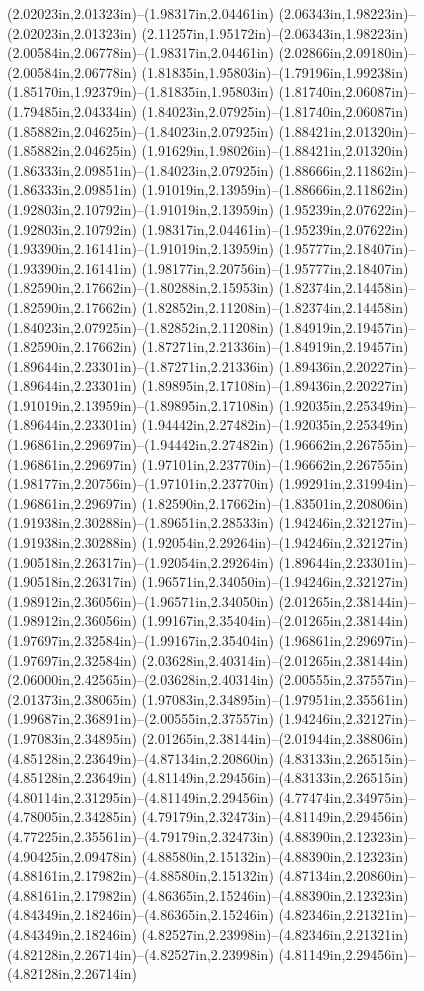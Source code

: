 (2.02023in,2.01323in)--(1.98317in,2.04461in) (2.06343in,1.98223in)--(2.02023in,2.01323in) (2.11257in,1.95172in)--(2.06343in,1.98223in) (2.00584in,2.06778in)--(1.98317in,2.04461in) (2.02866in,2.09180in)--(2.00584in,2.06778in) (1.81835in,1.95803in)--(1.79196in,1.99238in) (1.85170in,1.92379in)--(1.81835in,1.95803in) (1.81740in,2.06087in)--(1.79485in,2.04334in) (1.84023in,2.07925in)--(1.81740in,2.06087in) (1.85882in,2.04625in)--(1.84023in,2.07925in) (1.88421in,2.01320in)--(1.85882in,2.04625in) (1.91629in,1.98026in)--(1.88421in,2.01320in) (1.86333in,2.09851in)--(1.84023in,2.07925in) (1.88666in,2.11862in)--(1.86333in,2.09851in) (1.91019in,2.13959in)--(1.88666in,2.11862in) (1.92803in,2.10792in)--(1.91019in,2.13959in) (1.95239in,2.07622in)--(1.92803in,2.10792in) (1.98317in,2.04461in)--(1.95239in,2.07622in) (1.93390in,2.16141in)--(1.91019in,2.13959in) (1.95777in,2.18407in)--(1.93390in,2.16141in) (1.98177in,2.20756in)--(1.95777in,2.18407in) (1.82590in,2.17662in)--(1.80288in,2.15953in) (1.82374in,2.14458in)--(1.82590in,2.17662in) (1.82852in,2.11208in)--(1.82374in,2.14458in) (1.84023in,2.07925in)--(1.82852in,2.11208in) (1.84919in,2.19457in)--(1.82590in,2.17662in) (1.87271in,2.21336in)--(1.84919in,2.19457in) (1.89644in,2.23301in)--(1.87271in,2.21336in) (1.89436in,2.20227in)--(1.89644in,2.23301in) (1.89895in,2.17108in)--(1.89436in,2.20227in) (1.91019in,2.13959in)--(1.89895in,2.17108in) (1.92035in,2.25349in)--(1.89644in,2.23301in) (1.94442in,2.27482in)--(1.92035in,2.25349in) (1.96861in,2.29697in)--(1.94442in,2.27482in) (1.96662in,2.26755in)--(1.96861in,2.29697in) (1.97101in,2.23770in)--(1.96662in,2.26755in) (1.98177in,2.20756in)--(1.97101in,2.23770in) (1.99291in,2.31994in)--(1.96861in,2.29697in) (1.82590in,2.17662in)--(1.83501in,2.20806in) (1.91938in,2.30288in)--(1.89651in,2.28533in) (1.94246in,2.32127in)--(1.91938in,2.30288in) (1.92054in,2.29264in)--(1.94246in,2.32127in) (1.90518in,2.26317in)--(1.92054in,2.29264in) (1.89644in,2.23301in)--(1.90518in,2.26317in) (1.96571in,2.34050in)--(1.94246in,2.32127in) (1.98912in,2.36056in)--(1.96571in,2.34050in) (2.01265in,2.38144in)--(1.98912in,2.36056in) (1.99167in,2.35404in)--(2.01265in,2.38144in) (1.97697in,2.32584in)--(1.99167in,2.35404in) (1.96861in,2.29697in)--(1.97697in,2.32584in) (2.03628in,2.40314in)--(2.01265in,2.38144in) (2.06000in,2.42565in)--(2.03628in,2.40314in) (2.00555in,2.37557in)--(2.01373in,2.38065in) (1.97083in,2.34895in)--(1.97951in,2.35561in) (1.99687in,2.36891in)--(2.00555in,2.37557in) (1.94246in,2.32127in)--(1.97083in,2.34895in) (2.01265in,2.38144in)--(2.01944in,2.38806in) (4.85128in,2.23649in)--(4.87134in,2.20860in) (4.83133in,2.26515in)--(4.85128in,2.23649in) (4.81149in,2.29456in)--(4.83133in,2.26515in) (4.80114in,2.31295in)--(4.81149in,2.29456in) (4.77474in,2.34975in)--(4.78005in,2.34285in) (4.79179in,2.32473in)--(4.81149in,2.29456in) (4.77225in,2.35561in)--(4.79179in,2.32473in) (4.88390in,2.12323in)--(4.90425in,2.09478in) (4.88580in,2.15132in)--(4.88390in,2.12323in) (4.88161in,2.17982in)--(4.88580in,2.15132in) (4.87134in,2.20860in)--(4.88161in,2.17982in) (4.86365in,2.15246in)--(4.88390in,2.12323in) (4.84349in,2.18246in)--(4.86365in,2.15246in) (4.82346in,2.21321in)--(4.84349in,2.18246in) (4.82527in,2.23998in)--(4.82346in,2.21321in) (4.82128in,2.26714in)--(4.82527in,2.23998in) (4.81149in,2.29456in)--(4.82128in,2.26714in) 